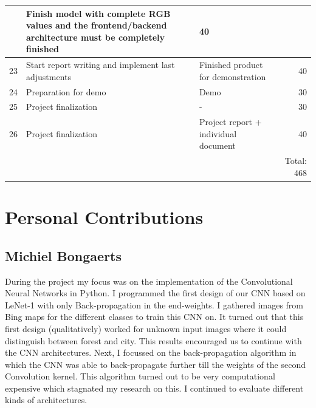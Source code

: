 \documentclass[a4paper,onecolumn]{report}
\begin{document}
\begin{center}
\begin{tabular}{| l | p{5cm}| p{5cm} | r | }
\begin{itemize}
	\end{itemize} & Finish model with complete RGB values and the frontend/backend architecture must be completely finished & 40 					\\  \hline
	23 & Start report writing and implement last adjustments & Finished product for demonstration & 40 	\\	\hline
	24 & Preparation for demo & Demo & 30				\\  \hline
    25 & Project finalization & - & 30 				\\ \hline
    26 & Project finalization & Project report + individual document & 40 \\ \hline
       & & & Total: 468  \\ \hline

    \hline
  \end{tabular}
\end{center}

\chapter{Personal Contributions}

\section{Michiel Bongaerts}
During the project my focus was on the implementation of the Convolutional Neural Networks in Python. I programmed the first design of our CNN based on LeNet-1 with only Back-propagation in the end-weights. I gathered images from Bing maps for the different classes to train this CNN on. It turned out that this first design (qualitatively) worked for unknown input images where it could distinguish between forest and city. This results encouraged us to continue with the CNN architectures. Next, I focussed on the back-propagation algorithm in which the CNN was able to back-propagate further till the weights of the second Convolution kernel. This algorithm turned out to be very computational expensive which stagnated my research on this. I continued to evaluate different kinds of architectures. 
\end{document}
